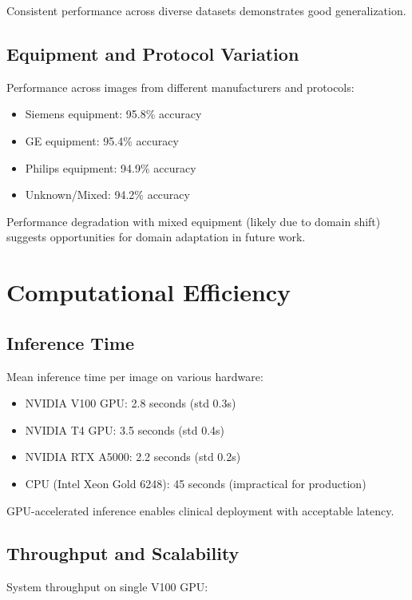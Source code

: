{Consistent performance across diverse datasets demonstrates good generalization.

\subsection{Equipment and Protocol Variation}

Performance across images from different manufacturers and protocols:

\begin{itemize}
    \item Siemens equipment: 95.8\% accuracy
    \item GE equipment: 95.4\% accuracy
    \item Philips equipment: 94.9\% accuracy
    \item Unknown/Mixed: 94.2\% accuracy
\end{itemize}

Performance degradation with mixed equipment (likely due to domain shift) suggests opportunities for domain adaptation in future work.

\section{Computational Efficiency}

\subsection{Inference Time}

Mean inference time per image on various hardware:

\begin{itemize}
    \item NVIDIA V100 GPU: 2.8 seconds (std 0.3s)
    \item NVIDIA T4 GPU: 3.5 seconds (std 0.4s)
    \item NVIDIA RTX A5000: 2.2 seconds (std 0.2s)
    \item CPU (Intel Xeon Gold 6248): 45 seconds (impractical for production)
\end{itemize}

GPU-accelerated inference enables clinical deployment with acceptable latency.

\subsection{Throughput and Scalability}

System throughput on single V100 GPU:

}
